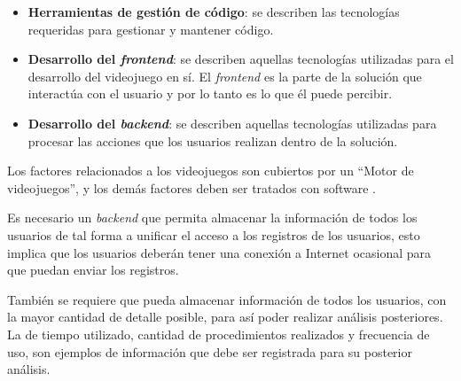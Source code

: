 \begin{itemize}
    \item \textbf{Herramientas de gestión de código}: se describen las
        tecnologías requeridas para gestionar y mantener código.
    \item \textbf{Desarrollo del \textit{frontend}}: se describen aquellas tecnologías
        utilizadas para el desarrollo del videojuego en sí. El \textit{frontend} es la
        parte de la solución que interactúa con el usuario y por lo tanto es lo
        que él puede percibir.
    \item \textbf{Desarrollo del \textit{backend}}: se describen aquellas tecnologías
        utilizadas para procesar las acciones que los usuarios realizan dentro
        de la solución.
\end{itemize}


Los factores relacionados a los videojuegos son cubiertos por un \enquote{Motor
    de videojuegos}, y los demás factores deben ser tratados con software
.

Es necesario un \textit{backend} que permita almacenar la información de todos
los usuarios de tal forma a unificar el acceso a los registros de los usuarios,
esto implica que los usuarios deberán tener una conexión a Internet ocasional
para que puedan enviar los registros.

También se requiere que pueda almacenar información de todos los usuarios, con
la mayor cantidad de detalle posible, para así poder realizar análisis
posteriores. La  de tiempo
utilizado, cantidad de procedimientos realizados y frecuencia de uso, son
ejemplos de información que debe ser registrada para su posterior análisis.






